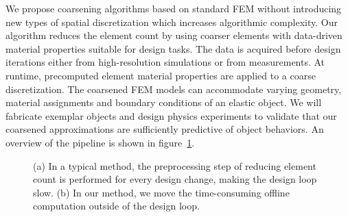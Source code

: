 We propose coarsening algorithms based on standard FEM
without introducing new types of spatial discretization which increases
algorithmic complexity.
Our algorithm reduces the element count by using coarser elements with data-driven
material properties suitable for design tasks.
The data is acquired before design iterations either from high-resolution simulations or from measurements.
At runtime, precomputed element material properties are applied to a coarse discretization.
The coarsened FEM models can accommodate varying geometry,
material assignments and boundary conditions of an elastic object.
We will fabricate exemplar objects and design physics experiments to validate that our coarsened approximations are sufficiently predictive of object behaviors.
An overview of the pipeline is shown in figure~\ref{fig:overview}.
\begin{figure}[ht]
	\centering
	\caption{
		(a) In a typical method, the preprocessing step of reducing element count is performed for every design change, making the design loop slow.
		(b) In our method, we move the time-consuming offline computation outside of the design loop.
	}
	\label{fig:overview}
\end{figure}
